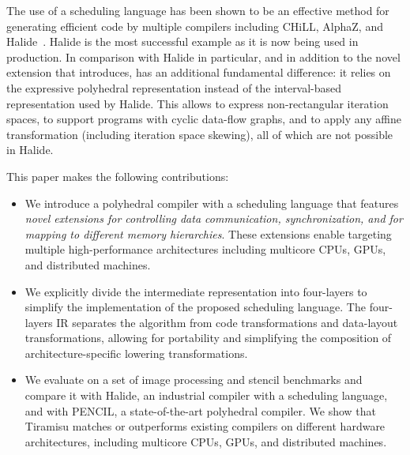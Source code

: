 The use of a scheduling language has been shown to be an effective method for generating efficient code by multiple compilers including CHiLL, AlphaZ, and Halide~\cite{halide_12,DBLP:conf/pldi/Ragan-KelleyBAPDA13}. Halide is the most successful example as it is now being used in production.
In comparison with Halide in particular, and in addition to the novel extension that \framework{} introduces, \framework{} has an additional fundamental difference: it relies on the expressive polyhedral representation instead of the interval-based representation used by Halide.  This allows \framework{} to express non-rectangular iteration spaces, to support programs with cyclic data-flow graphs, and to apply any affine transformation (including iteration space skewing), all of which are not possible in Halide.

This paper makes the following contributions:

\begin{itemize}
  \item We introduce a polyhedral compiler with a scheduling language that features \emph{novel extensions for controlling data communication, synchronization, and for mapping to different memory hierarchies}.  These extensions enable targeting multiple high-performance architectures including multicore CPUs, GPUs, and distributed machines.

  \item We explicitly divide the intermediate representation into four-layers to simplify the implementation of the proposed scheduling language.  The four-layers IR separates the algorithm from code transformations and data-layout transformations, allowing for portability and simplifying the composition of architecture-specific lowering transformations.

  \item We evaluate \framework{} on a set of image processing and stencil benchmarks and compare it with Halide, an industrial compiler with a scheduling language, and with PENCIL, a state-of-the-art polyhedral compiler.  We show that Tiramisu matches or outperforms existing compilers on different hardware architectures, including multicore CPUs, GPUs, and distributed machines.
\end{itemize}

